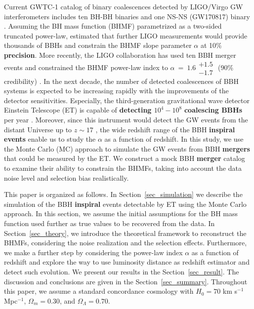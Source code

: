 \documentclass[twocolumn]{aastex62}
\begin{document}
Current GWTC-1 catalog of binary coalescences detected by LIGO/Virgo GW interferometers includes ten BH-BH binaries and one NS-NS (GW170817) binary \citep{Abbott2018}.  Assuming the BH mass function (BHMF) parametrized as a two-sided truncated power-law, \citet{Kovetz2017PhRvD} estimated that further LIGO measurements would provide thousands of BBHs and constrain the BHMF slope parameter $\alpha$ at 10\% {\bf precision}. More recently, the LIGO collaboration has used ten BBH merger events and constrained the BHMF power-law index to $\alpha~=~1.6\substack{+1.5\\-1.7}$ (90\% credibility) \citep{Abbott2018b}. 
In the next decade, the number of detected coalescences of BBH systems is expected to be increasing rapidly with the improvements of the detector sensitivities. Especially, the third-generation gravitational wave detector Einstein Telescope (ET) is capable of \textbf{detecting $10^4-10^8$} \textbf{coalescing BBHs} per year \citep{Abernathy2011}. Moreover, since this instrument would detect the GW events from the distant Universe up to $z\sim17$ \citep{Abernathy2011}, the wide redshift range of the BBH \textbf{inspiral events} enable us to study the $\alpha$ as a function of redshift. In this study, we use the Monte Carlo (MC) approach to simulate the GW events from BBH \textbf{mergers} that could be measured by the ET. We construct a mock BBH \textbf{merger} catalog to examine their ability to constrain the BHMFs, taking into account the data noise level and selection bias realistically.

This paper is organized as follows. In Section~\ref{sec_simulation} we describe the simulation of the BBH \textbf{inspiral} events detectable by ET using the Monte Carlo approach. In this section, we assume the initial assumptions for the BH mass function used further as true values to be recovered from the data. In Section~\ref{sec_theory}, we introduce the theoretical framework to reconstruct the BHMFs, considering the noise realization and the selection effects. Furthermore, we make a further step by considering the power-law index $\alpha$ as a function of redshift and explore the way to use luminosity distance as redshift estimator and detect such evolution. We present our results in the Section~\ref{sec_result}. The discussion and conclusions are given in the Section~\ref{sec_summary}. Throughout this paper, we assume a standard concordance cosmology with $H_0= 70$ km s$^{-1}$ Mpc$^{-1}$, $\Omega{_m} = 0.30$, and $\Omega{_\Lambda} = 0.70$.
\end{document}
